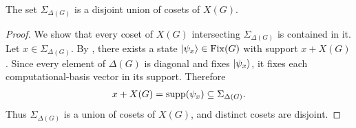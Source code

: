 \begin{corollary}\label{cor:sigma-cosets}
    The set $\Sigma_{\Delta(G)}$ is a disjoint union of cosets of $X(G)$.
\end{corollary}
\begin{proof}
    We show that every coset of $X(G)$ intersecting $\Sigma_{\Delta(G)}$ is contained in it.
    Let $x\in\Sigma_{\Delta(G)}$.
    By , there exists a state $|\psi_x\rangle\in\operatorname{Fix}(G)$ with support $x+X(G)$.
    Since every element of $\Delta(G)$ is diagonal and fixes $|\psi_x\rangle$, it fixes each computational-basis vector in its support.
    Therefore
    \begin{align}
        x+X(G)=\operatorname{supp}(\psi_x)\subseteq\Sigma_{\Delta(G)}.
    \end{align}
    Thus $\Sigma_{\Delta(G)}$ is a union of cosets of $X(G)$, and distinct cosets are disjoint.
\end{proof}


